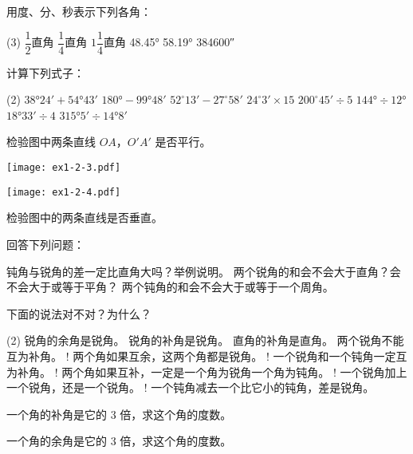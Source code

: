 \begin{Exercise}
\begin{question}
	\item 用度、分、秒表示下列各角：
	\begin{tasks}(3)
		\task $\dfrac{1}{2}$直角
		\task $\dfrac{1}{4}$直角
		\task $1\dfrac{1}{4}$直角
		\task \ang{48.45}
		\task \ang{58.19}
		\task \ang{;;384600}
	\end{tasks}
	\item 计算下列式子：
	\begin{tasks}(2)
		\task $\ang{38;24;}+\ang{54;43;}$
		\task $\ang{180}-\ang{99;48;}$
		\task $52^{\circ}13'-27^{\circ}58'$
		\task $24^{\circ}3'\times 15$
		\task $200^{\circ}45'\div 5$
		\task $\ang{144}\div \ang{12}$
		\task $\ang{18;33;} \div 4$
		\task $\ang{315;5;}\div \ang{14;8;}$
	\end{tasks}
	\item\label{exec:1-2-3} 检验图中两条直线 $OA$，$O'A'$ 是否平行。
	\begin{figurehere}
		\begin{minipage}[b]{0.48\linewidth}
			\centering
			\texttt{[image: ex1-2-3.pdf]}
			\caption*{第 \ref{exec:1-2-3} 题}
		\end{minipage}
		\begin{minipage}[b]{0.48\linewidth}
			\centering
			\texttt{[image: ex1-2-4.pdf]}
			\caption*{第 \ref{exec:1-2-4} 题}
		\end{minipage}
	\end{figurehere}
	\item\label{exec:1-2-4} 检验图中的两条直线是否垂直。
	\item 回答下列问题：
	\begin{tasks}
		\task 钝角与锐角的差一定比直角大吗？举例说明。
		\task 两个锐角的和会不会大于直角？会不会大于或等于平角？
		\task 两个钝角的和会不会大于或等于一个周角。
	\end{tasks}
	\item 下面的说法对不对？为什么？
	\begin{tasks}(2)
		\task 锐角的余角是锐角。
		\task 锐角的补角是锐角。
		\task 直角的补角是直角。
		\task 两个锐角不能互为补角。
		\task! 两个角如果互余，这两个角都是锐角。
		\task! 一个锐角和一个钝角一定互为补角。
		\task! 两个角如果互补，一定是一个角为锐角一个角为钝角。
		\task! 一个锐角加上一个锐角，还是一个锐角。
		\task! 一个钝角减去一个比它小的钝角，差是锐角。
	\end{tasks}
	\item 一个角的补角是它的 3 倍，求这个角的度数。
	\item 一个角的余角是它的 3 倍，求这个角的度数。

\end{question}
\end{Exercise}
